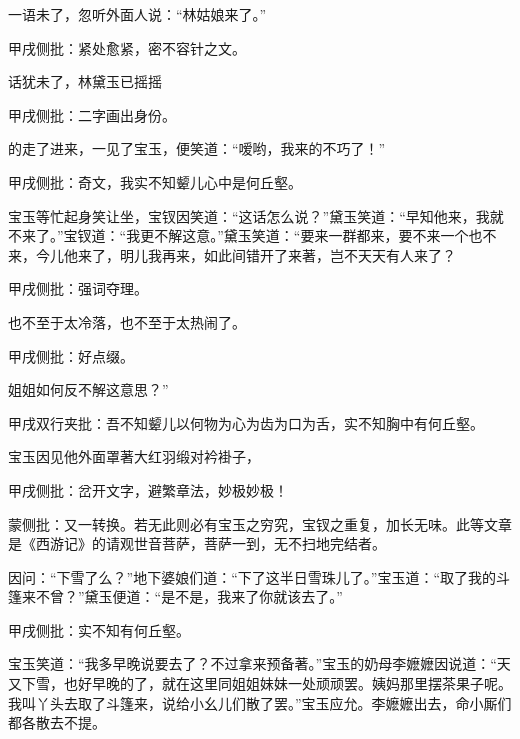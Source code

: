 \begin{parag}
    一语未了，忽听外面人说：“林姑娘来了。”\begin{note}甲戌侧批：紧处愈紧，密不容针之文。\end{note}话犹未了，林黛玉已摇摇\begin{note}甲戌侧批：二字画出身份。\end{note}的走了进来，一见了宝玉，便笑道：“嗳哟，我来的不巧了！”\begin{note}甲戌侧批：奇文，我实不知颦儿心中是何丘壑。\end{note}宝玉等忙起身笑让坐，宝钗因笑道：“这话怎么说？”黛玉笑道：“早知他来，我就不来了。”宝钗道：“我更不解这意。”黛玉笑道：“要来一群都来，要不来一个也不来，今儿他来了，明儿我再来，如此间错开了来著，岂不天天有人来了？\begin{note}甲戌侧批：强词夺理。\end{note}也不至于太冷落，也不至于太热闹了。\begin{note}甲戌侧批：好点缀。\end{note}姐姐如何反不解这意思？”\begin{note}甲戌双行夹批：吾不知颦儿以何物为心为齿为口为舌，实不知胸中有何丘壑。\end{note}
\end{parag}


\begin{parag}
    宝玉因见他外面罩著大红羽缎对衿褂子，\begin{note}甲戌侧批：岔开文字，避繁章法，妙极妙极！\end{note}\begin{note}蒙侧批：又一转换。若无此则必有宝玉之穷究，宝钗之重复，加长无味。此等文章是《西游记》的请观世音菩萨，菩萨一到，无不扫地完结者。\end{note}因问：“下雪了么？”地下婆娘们道：“下了这半日雪珠儿了。”宝玉道：“取了我的斗篷来不曾？”黛玉便道：“是不是，我来了你就该去了。”\begin{note}甲戌侧批：实不知有何丘壑。\end{note}宝玉笑道：“我多早晚说要去了？不过拿来预备著。”宝玉的奶母李嬷嬷因说道：“天又下雪，也好早晚的了，就在这里同姐姐妹妹一处顽顽罢。姨妈那里摆茶果子呢。我叫丫头去取了斗篷来，说给小幺儿们散了罢。”宝玉应允。李嬷嬷出去，命小厮们都各散去不提。
\end{parag}



